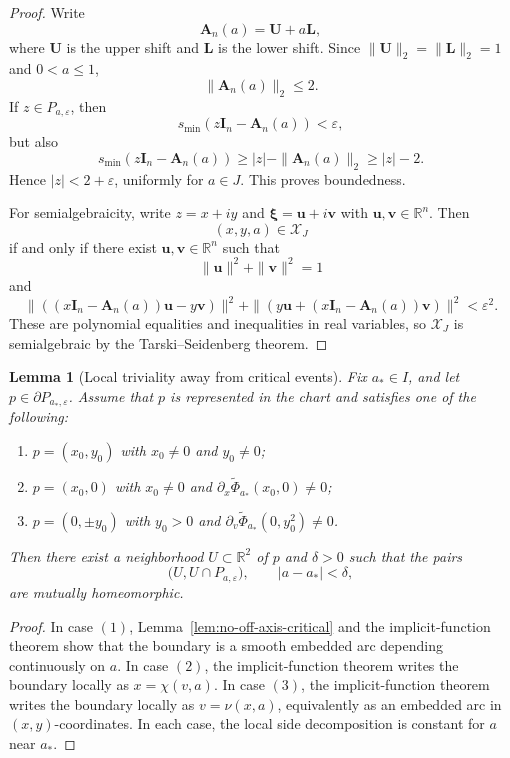 \documentclass[11pt]{article}
\newtheorem{lemma}[theorem]{Lemma}
\newcommand{\R}{\mathbb{R}}
\begin{document}
\begin{proof}
Write
\[
\mathbf A_n(a)=\mathbf U+a\mathbf L,
\]
where \(\mathbf U\) is the upper shift and \(\mathbf L\) is the lower shift. Since \(\|\mathbf U\|_2=\|\mathbf L\|_2=1\) and \(0<a\le 1\),
\[
\|\mathbf A_n(a)\|_2\le 2.
\]
If \(z\in P_{a,\varepsilon}\), then
\[
s_{\min}(z\mathbf I_n-\mathbf A_n(a))<\varepsilon,
\]
but also
\[
s_{\min}(z\mathbf I_n-\mathbf A_n(a))
\ge |z|-\|\mathbf A_n(a)\|_2
\ge |z|-2.
\]
Hence \(|z|<2+\varepsilon\), uniformly for \(a\in J\). This proves boundedness.

For semialgebraicity, write \(z=x+iy\) and \(\boldsymbol\xi=\mathbf u+i\mathbf v\) with \(\mathbf u,\mathbf v\in\R^n\). Then
\[
(x,y,a)\in \mathcal X_J
\]
if and only if there exist \(\mathbf u,\mathbf v\in\R^n\) such that
\[
\|\mathbf u\|^2+\|\mathbf v\|^2=1
\]
and
\[
\|((x\mathbf I_n-\mathbf A_n(a))\mathbf u-y\mathbf v)\|^2
+
\|(y\mathbf u+(x\mathbf I_n-\mathbf A_n(a))\mathbf v)\|^2
<\varepsilon^2.
\]
These are polynomial equalities and inequalities in real variables, so \(\mathcal X_J\) is semialgebraic by the Tarski--Seidenberg theorem.
\end{proof}

\begin{lemma}[Local triviality away from critical events]\label{lem:local-trivial}
Fix \(a_*\in I\), and let \(p\in \partial P_{a_*,\varepsilon}\). Assume that \(p\) is represented in the chart and satisfies one of the following:
\begin{enumerate}
\item \(p=(x_0,y_0)\) with \(x_0\neq 0\) and \(y_0\neq 0\);
\item \(p=(x_0,0)\) with \(x_0\neq 0\) and \(\partial_x\widetilde\Phi_{a_*}(x_0,0)\neq 0\);
\item \(p=(0,\pm y_0)\) with \(y_0>0\) and \(\partial_v\widetilde\Phi_{a_*}(0,y_0^2)\neq 0\).
\end{enumerate}
Then there exist a neighborhood \(U\subset\R^2\) of \(p\) and \(\delta>0\) such that the pairs
\[
\bigl(U,U\cap P_{a,\varepsilon}\bigr),
\qquad
|a-a_*|<\delta,
\]
are mutually homeomorphic.
\end{lemma}

\begin{proof}
In case \((1)\), Lemma~\ref{lem:no-off-axis-critical} and the implicit-function theorem show that the boundary is a smooth embedded arc depending continuously on \(a\). In case \((2)\), the implicit-function theorem writes the boundary locally as \(x=\chi(v,a)\). In case \((3)\), the implicit-function theorem writes the boundary locally as \(v=\nu(x,a)\), equivalently as an embedded arc in \((x,y)\)-coordinates. In each case, the local side decomposition is constant for \(a\) near \(a_*\).
\end{proof}
\end{document}
